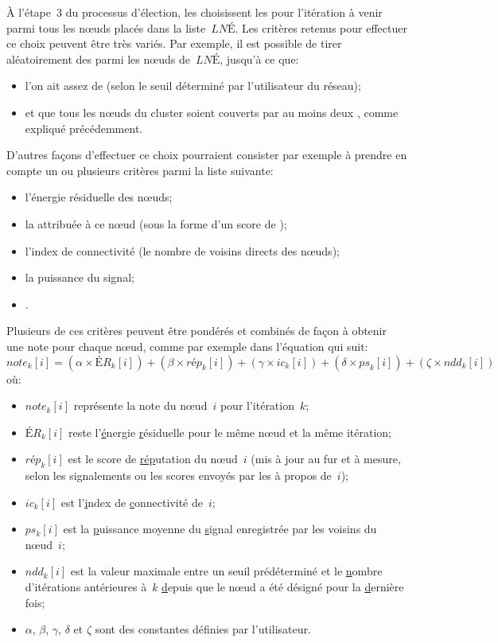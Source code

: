 À l'étape~3 du processus d'élection, les \chs choisissent les \cns pour l'itération à venir parmi tous les nœuds placés dans la liste~$\mathit{LNÉ}$.
Les critères retenus pour effectuer ce choix peuvent être très variés.
Par exemple, il est possible de tirer aléatoirement des \cns parmi les nœuds de~$\mathit{LNÉ}$, jusqu'à ce que:
\begin{itemize}
    \item l'on ait assez de \cns (selon le seuil déterminé par l'utilisateur du réseau);
    \item et que tous les nœuds du cluster soient couverts par au moins deux \cns, comme expliqué précédemment.
\end{itemize}
D'autres façons d'effectuer ce choix pourraient consister par exemple à prendre en compte un ou plusieurs critères parmi la liste suivante:
\begin{itemize}
    \item l'énergie résiduelle des nœuds;
    \item la  attribuée à ce nœud (sous la forme d'un score de \reput);
    \item l'index de connectivité (le nombre de voisins directs des nœuds);
    \item la puissance du signal;
    \item \etc.
\end{itemize}
Plusieurs de ces critères peuvent être pondérés et combinés de façon à obtenir une note pour chaque nœud, comme par exemple dans l'équation qui suit:%
\begin{equation*}
    \label{se:eqn:score}
    \mathit{note}_k[i] = (\alpha \times \mathit{ÉR}_k[i]) + (\beta \times \mathit{rép}_k[i]) + (\gamma \times \mathit{ic}_k[i]) + (\delta \times \mathit{ps}_k[i]) + (\zeta \times \mathit{ndd}_k[i])
\end{equation*}
où:
\begin{itemize}
    \item $\mathit{note}_k[i]$ représente la note du nœud~$i$ pour l'itération~$k$;
    \item $\mathit{ÉR}_k[i]$ reste l'\underline{é}nergie \underline{r}ésiduelle pour le même nœud et la même itération;
    \item $\mathit{rép}_k[i]$ est le score de \underline{rép}utation du nœud~$i$ (mis à jour au fur et à mesure, selon les signalements ou les scores envoyés par les \cns à propos de~$i$);
    \item $\mathit{ic}_k[i]$ est l'\underline{i}ndex de \underline{c}onnectivité de~$i$;
    \item $ps_k[i]$ est la \underline{p}uissance moyenne du \underline{s}ignal enregistrée par les voisins du nœud~$i$;
    \item $ndd_k[i]$ est la valeur maximale entre un seuil prédéterminé et le \underline{n}ombre d'itérations antérieures à~$k$ \underline{d}epuis que le nœud a été désigné \cn pour la \underline{d}ernière fois;
    \item $\alpha$, $\beta$, $\gamma$, $\delta$ et $\zeta$ sont des constantes définies par l'utilisateur.
\end{itemize}
